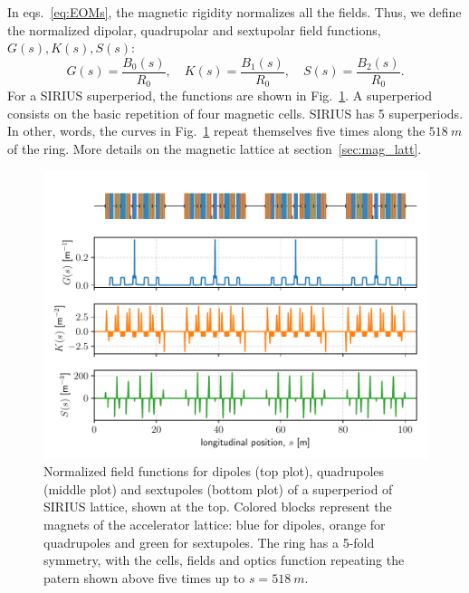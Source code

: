 In eqs.~\eqref{eq:EOMs}, the magnetic rigidity normalizes all the fields. Thus, we define the normalized dipolar, quadrupolar and sextupolar field functions, $G(s), K(s), S(s)$:
\begin{equation}
    G(s) = \frac{B_0(s)}{R_0}, \quad K(s) = \frac{B_1(s)}{R_0}, \quad S(s) = \frac{B_2(s)}{R_0}.
    \label{eq:mag_funcs}
\end{equation}
For a SIRIUS superperiod, the functions are shown in Fig.~\ref{fig:field_funcs}. A superperiod consists on the basic repetition of four magnetic cells. SIRIUS has 5 superperiods. In other, words, the curves in Fig.~\ref{fig:field_funcs} repeat themselves five times along the $518~\unit{m}$ of the ring. More details on the magnetic lattice at section~\ref{sec:mag_latt}.
\begin{figure}[htb]
    \centering
    \includegraphics[width=\textwidth]{Images/field_functions.pdf}
    \caption[Normalized field functions for dipoles, quadrupoles and sextupoles of a superperiod of SIRIUS lattice]{Normalized field functions for dipoles (top plot), quadrupoles (middle plot) and sextupoles (bottom plot) of a superperiod of SIRIUS lattice, shown at the top. Colored blocks represent the magnets of the accelerator lattice: blue for dipoles, orange for quadrupoles and green for sextupoles. The ring has a 5-fold symmetry, with the cells, fields and optics function repeating the patern shown above five times up to $s=518~\unit{m}$.}
    \label{fig:field_funcs}
\end{figure}
